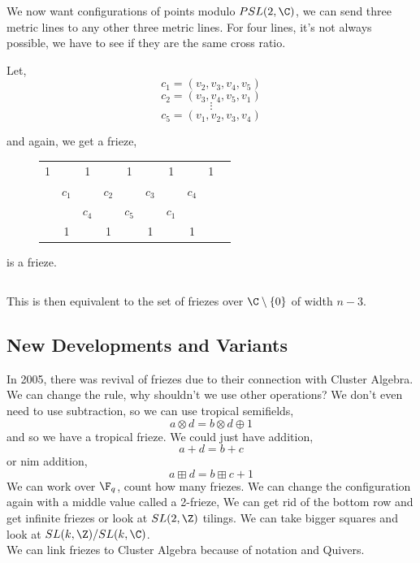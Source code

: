 \documentclass{article}
\begin{document}
\newpage
We now want configurations of points modulo $PSL(2, \C)$, we can send three metric lines to any other three metric lines. For four lines, it's not always possible, we have to see if they are the same cross ratio.

Let,
$$ c_1 = (v_2, v_3, v_4, v_5) $$
$$ c_2 = (v_3, v_4, v_5, v_1) $$
$$ \vdots $$
$$ c_5 = (v_1, v_2, v_3, v_4) $$

and again, we get a frieze,
\begin{figure}[!ht]
\centering
\begin{tabular}{cccccccccc}
 1&&1&&1&&1&&1& \\
 &$c_1$&&$c_2$&&$c_3$&&$c_4$&&\\
 &&$c_4$&&$c_5$&&$c_1$&&\\
 &1&&1&&1&&1&& \\
\end{tabular}
\end{figure}

is a frieze.

$$  $$

This is then equivalent to the set of friezes over $\C \setminus \{0\}$ of width $n-3$.

\subsection{New Developments and Variants}
In 2005, there was revival of friezes due to their connection with Cluster Algebra. We can change the rule, why shouldn't we use other operations? We don't even need to use subtraction, so we can use tropical semifields,
$$ a \otimes d = b \otimes d \oplus 1 $$
and so we have a tropical frieze. We could just have addition,
$$ a + d = b + c $$
or nim addition,
$$ a \boxplus d = b \boxplus c +1 $$
We can work over $\F_q$, count how many friezes. We can change the configuration again with a middle value called a 2-frieze,
We can get rid of the bottom row and get infinite friezes or look at $SL(2, \Z)$ tilings. We can take bigger squares and look at $SL(k, \Z) / SL(k, \C)$.\\

We can link friezes to Cluster Algebra because of notation and Quivers.
\end{document}
